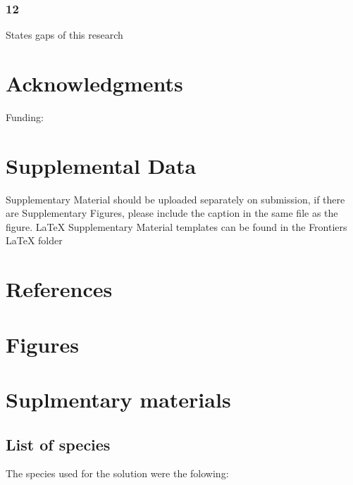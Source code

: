 \documentclass[]{article}
\begin{document}
\hypertarget{section-9}{%
\subsubsection{12}\label{section-9}}

States gaps of this research

\hypertarget{acknowledgments}{%
\section*{Acknowledgments}\label{acknowledgments}}

Funding:

\hypertarget{supplemental-data}{%
\section{Supplemental Data}\label{supplemental-data}}

Supplementary Material should be uploaded separately on submission, if there are
Supplementary Figures, please include the caption in the same file as the
figure. LaTeX Supplementary Material templates can be found in the Frontiers
LaTeX folder

\hypertarget{references}{%
\section{References}\label{references}}

\hypertarget{figures}{%
\section*{Figures}\label{figures}}

\hypertarget{suplmentary-materials}{%
\section{Suplmentary materials}\label{suplmentary-materials}}

\hypertarget{list-of-species}{%
\subsection{List of species}\label{list-of-species}}

The species used for the solution were the folowing:
\end{document}
